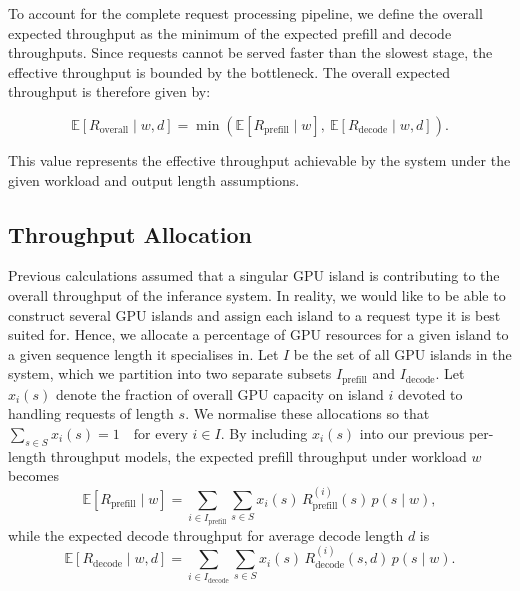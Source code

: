 To account for the complete request processing pipeline, we define the overall expected throughput as the minimum of the expected prefill and decode throughputs.
Since requests cannot be served faster than the slowest stage, the effective throughput is bounded by the bottleneck.
The overall expected throughput is therefore given by:

\[
\mathbb{E}[R_{\text{overall}} \mid w, d] = \min\left( \mathbb{E}[R_{\text{prefill}} \mid w],\ \mathbb{E}[R_{\text{decode}} \mid w, d] \right).
\]

This value represents the effective throughput achievable by the system under the given workload and output length assumptions.


\subsection{Throughput Allocation}

Previous calculations assumed that a singular GPU island is contributing to the overall throughput of the inferance system.
In reality, we would like to be able to construct several GPU islands and assign each island to a request type it is best suited for.
Hence, we allocate a percentage of GPU resources for a given island to a given sequence length it specialises in.
Let \(I\) be the set of all GPU islands in the system, which we partition into two separate subsets \(I_{\mathrm{prefill}}\) and \(I_{\mathrm{decode}}\).
Let \(x_i(s)\) denote the fraction of overall GPU capacity on island \(i\) devoted to handling requests of length \(s\). 
We normalise these allocations so that \(\sum_{s\in S} x_i(s) = 1 \quad\text{for every }i\in I. \)
By including \(x_i(s)\) into our previous per-length throughput models, the expected prefill throughput under workload \(w\) becomes
\[
\mathbb{E}[R_{\mathrm{prefill}}\mid w]
=\sum_{i\in I_{\mathrm{prefill}}}\sum_{s\in S}
x_i(s)\,R_{\mathrm{prefill}}^{(i)}(s)\,p(s\mid w),
\]
while the expected decode throughput for average decode length \(d\) is
\[
\mathbb{E}[R_{\mathrm{decode}}\mid w,d]
=\sum_{i\in I_{\mathrm{decode}}}\sum_{s\in S}
x_i(s)\,R_{\mathrm{decode}}^{(i)}(s,d)\,p(s\mid w).
\]


